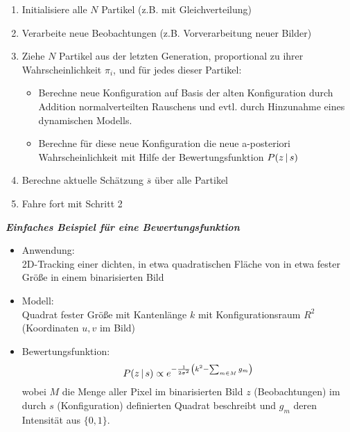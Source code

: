 \begin{enumerate}
\item Initialisiere alle $N$ Partikel (z.B. mit Gleichverteilung)
\item Verarbeite neue Beobachtungen (z.B. Vorverarbeitung neuer Bilder)
\item Ziehe $N$ Partikel aus der letzten Generation, proportional zu ihrer Wahrscheinlichkeit $\pi_i$, und für jedes dieser Partikel:
\begin{itemize}
\item Berechne neue Konfiguration auf Basis der alten Konfiguration durch Addition normalverteilten Rauschens und evtl. durch Hinzunahme eines dynamischen Modells.
\item Berechne für diese neue Konfiguration die neue a-posteriori Wahrscheinlichkeit mit Hilfe der Bewertungsfunktion $P(z \, | \, s)$
\end{itemize}
\item Berechne aktuelle Schätzung $\overline{s}$ über alle Partikel
\item Fahre fort mit Schritt 2
\end{enumerate}

\textbf{\textsl{Einfaches Beispiel für eine Bewertungsfunktion}}

\begin{itemize}
\item Anwendung: \\ 2D-Tracking einer dichten, in etwa quadratischen Fläche von in etwa fester Größe in einem binarisierten Bild
\item Modell: \\ Quadrat fester Größe mit Kantenlänge $k$ mit Konfigurationsraum $R^2$ (Koordinaten $u,v$ im Bild)
\item Bewertungsfunktion: $$P(z \, | \, s) \propto e^{- \frac{1}{2 \sigma^2} \left( k^2 - \sum_{m \in M} g_m \right)}$$ wobei $M$ die Menge aller Pixel im binarisierten Bild $z$ (Beobachtungen) im durch $s$ (Konfiguration) definierten Quadrat beschreibt und $g_m$ deren Intensität aus $\{0,1\}$.
\end{itemize}









